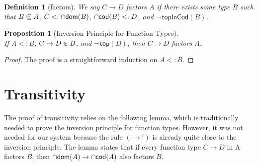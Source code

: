 \documentclass{article}
\newtheorem{proposition}[theorem]{Proposition}
\newtheorem{definition}[theorem]{Definition}
\begin{document}
\begin{definition}[factors]
  We say $C \to D$ \emph{factors} $A$
  if there exists some type $B$ such that
  $B \subsetpluseq A$, $C <: \cap\mathsf{dom}(B)$, $\cap\mathsf{cod}(B) <: D$, and
  $\neg\,\mathsf{topInCod}(B)$.
\end{definition}

\begin{proposition}[Inversion Principle for Function Types]
  \label{prop:⊑-fun-inv}\ \\
  If $A <: B$, $C \to D \inplus B$, and $\neg\,\mathsf{top}(D)$, then
  $C \to D$ factors $A$.
\end{proposition}
\begin{proof}
  The proof is a straightforward induction on $A <: B$.
\end{proof}

\section{Transitivity}
\label{sec:trans}

The proof of transitivity relies on the following lemma, which is
traditionally needed to prove the inversion principle for function
types. However, it was not needed for our system because the rule
$(\to')$ is already quite close to the inversion principle.
The lemma states that if every function type $C \to D$ in A
factors $B$, then $\cap\mathsf{dom}(A) \to \cap\mathsf{cod}(A)$ also factors $B$.
\end{document}

